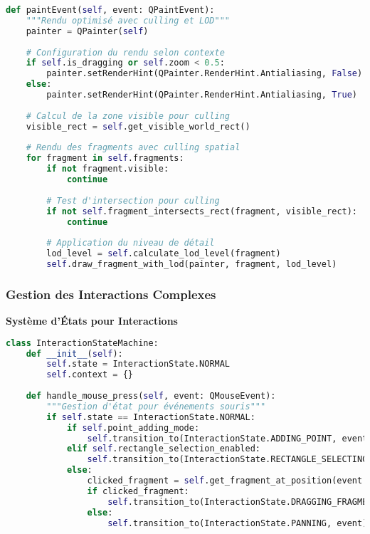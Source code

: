 \documentclass[12pt,a4paper]{report}
\begin{document}
\begin{lstlisting}[language=Python]
def paintEvent(self, event: QPaintEvent):
    """Rendu optimisé avec culling et LOD"""
    painter = QPainter(self)
    
    # Configuration du rendu selon contexte
    if self.is_dragging or self.zoom < 0.5:
        painter.setRenderHint(QPainter.RenderHint.Antialiasing, False)
    else:
        painter.setRenderHint(QPainter.RenderHint.Antialiasing, True)
    
    # Calcul de la zone visible pour culling
    visible_rect = self.get_visible_world_rect()
    
    # Rendu des fragments avec culling spatial
    for fragment in self.fragments:
        if not fragment.visible:
            continue
        
        # Test d'intersection pour culling
        if not self.fragment_intersects_rect(fragment, visible_rect):
            continue
        
        # Application du niveau de détail
        lod_level = self.calculate_lod_level(fragment)
        self.draw_fragment_with_lod(painter, fragment, lod_level)
\end{lstlisting}

\subsubsection{Gestion des Interactions Complexes}

\textbf{Système d'États pour Interactions}

\begin{lstlisting}[language=Python]
class InteractionStateMachine:
    def __init__(self):
        self.state = InteractionState.NORMAL
        self.context = {}
    
    def handle_mouse_press(self, event: QMouseEvent):
        """Gestion d'état pour événements souris"""
        if self.state == InteractionState.NORMAL:
            if self.point_adding_mode:
                self.transition_to(InteractionState.ADDING_POINT, event)
            elif self.rectangle_selection_enabled:
                self.transition_to(InteractionState.RECTANGLE_SELECTING, event)
            else:
                clicked_fragment = self.get_fragment_at_position(event.pos())
                if clicked_fragment:
                    self.transition_to(InteractionState.DRAGGING_FRAGMENT, event)
                else:
                    self.transition_to(InteractionState.PANNING, event)
\end{lstlisting}
\end{document}
